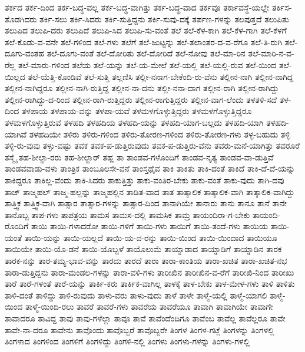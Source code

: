 {ತರ್ಕದ
ತರ್ಕ-ದಿಂದ
ತರ್ಕ-ಬದ್ಧ-ವಲ್ಲ
ತರ್ಕ-ಬದ್ಧ-ವಾಗಿತ್ತು
ತರ್ಕ-ಬದ್ಧ-ವಾದ
ತರ್ಕವೂ
ತರ್ಕಾವಸ್ಥೆ-ಯಲ್ಲೇ
ತರ್ಕಿಸ-ತೊಡಗಿದರು
ತರ್ಕಿ-ಸಲು
ತರ್ಕಿ-ಸಿದರು
ತರ್ಕಿ-ಸುತ್ತಿದ್ದನು
ತರ್ಕಿ-ಸುವು-ದಕ್ಕೆ
ತರ್ಪಣ-ಗಳನ್ನು
ತಲಪುತ್ತದೆ
ತಲುಪಿತು
ತಲುಪಿದ
ತಲುಪಿ-ದರು
ತಲುಪಿದೆ
ತಲುಪಿ-ಸಿದ
ತಲುಪಿ-ಸು-ವಂತೆ
ತಲೆ
ತಲೆ-ಕೆಳ-ಕಾಗಿ
ತಲೆ-ಕೆಳ-ಗಾಗಿ
ತಲೆ-ಕೆಳಗೆ
ತಲೆ-ಕೊಡು-ವ-ವನೇ
ತಲೆ-ಗಳಿಂದ
ತಲೆ-ಗಳು
ತಲೆಗೆ
ತಲೆ-ಜುಟ್ಟನ್ನು
ತಲೆ-ತಲಾಂತರ-ದ-ವ-ರೆಗೂ
ತಲೆ-ತಿ-ರುಗಿ
ತಲೆ-ದೂಗು-ವಂತಹ
ತಲೆ-ದೂಗು-ವಂತೆ
ತಲೆ-ದೋರಿತು
ತಲೆ-ದೋರಿದೆ
ತಲೆ-ನೋವು
ತಲೆ-ಮಾ-ರಿನ
ತಲೆ-ಮಾರಿ-ನ-ವ-ರೆಲ್ಲ
ತಲೆ-ಮಾರು-ಗಳಿಂದ
ತಲೆಯ
ತಲೆ-ಯನ್ನು
ತಲೆ-ಯ-ಮೇಲೆ
ತಲೆ-ಯಲ್ಲಿ
ತಲೆ-ಯಲ್ಲಿ-ರುವ
ತಲೆ-ಯಿಂದ
ತಲೆ-ಯಿಲ್ಲದ
ತಲೆ-ಯೆತ್ತಿ-ಕೊಂಡಿವೆ
ತಲೆ-ಸುತ್ತಿ
ತಲ್ಲಣಿಸಿ
ತಲ್ಲೀ-ನನಾಗ-ಬೇಕೆಂದಿ-ರು-ವೆನು
ತಲ್ಲೀನ-ನಾಗಿ
ತಲ್ಲೀನ-ನಾಗಿದ್ದ
ತಲ್ಲೀನ-ನಾಗಿದ್ದರೂ
ತಲ್ಲೀನ-ನಾಗಿ-ರುತ್ತಿದ್ದ
ತಲ್ಲೀನ-ನಾ-ದನು
ತಲ್ಲೀ-ನನಾ-ದಾಗ
ತಲ್ಲೀನ-ರಾಗಿ
ತಲ್ಲೀನ-ರಾಗಿದ್ದು
ತಲ್ಲೀನ-ರಾಗಿದ್ದು-ದ-ರಿಂದ
ತಲ್ಲೀನ-ರಾಗಿ-ರುತ್ತಿದ್ದರು
ತಲ್ಲೀನ-ರಾಗುತ್ತಿದ್ದರು
ತಲ್ಲೀನ-ವಾಗ-ಲೆಂದು
ತಳತಳಿ-ಸದೆ
ತಳ-ದಿಂದ
ತಳಪಾಯ
ತಳಪಾಯ-ವನ್ನು
ತಳಪಾ-ಯವೆ
ತಳಮಳಗೊಳ್ಳುತ್ತಿದ್ದರು
ತಳಮಳಗೊಳ್ಳುತ್ತಿದ್ದರೂ
ತಳಮಳಗೊಳ್ಳುತ್ತಿರುವೆ
ತಳಹದಿ
ತಳಹದಿಯ
ತಳಹದಿ-ಯನ್ನು
ತಳಹದಿ-ಯಾಗ-ಬಲ್ಲದು
ತಳಹದಿ-ಯಾಗಿ
ತಳಹದಿ-ಯಾಗಿವೆ
ತಳಹದಿಯೇ
ತಳಿರು
ತಳಿರು-ಗಳಿಂದ
ತಳಿರು-ತೋರಣ-ಗಳಿಂದ
ತಳಿರು-ತೋರಣ-ಗಳು
ತಳ್ಳ-ಬಹುದು
ತಳ್ಳಿ
ತಳ್ಳಿ-ರು-ವುವು
ತಳ್ಳು-ವಷ್ಟು
ತವಕ
ತವಕ-ಪ-ಡುತ್ತಿರುವುದು
ತವಕ-ಪ-ಡುತ್ತಿರು-ವೆನು
ತವರು-ಮನೆ-ಯಾಗಿತ್ತು
ತವರೂರೆ
ತಸ್ಮೈ
ತಹ-ಶೀಲ್ದಾ-ರರು
ತಹ-ಶೀಲ್ದಾರ್
ತಹ್ಲ
ತಾ
ತಾಂಡವ-ಗಳೊಂದಿಗೆ
ತಾಂಡವ-ನೃತ್ಯ
ತಾಂಡವ-ವಾ-ಡುತ್ತಿವೆ
ತಾಂಡವವಾಡು-ವಳು
ತಾಂತ್ರಿಕ
ತಾಂಬೂಲಸೇ-ವನೆ
ತಾಂಸ್ತಥೈವ
ತಾಕಿ
ತಾಕಿತು
ತಾಕಿ-ದಂತೆ
ತಾಕಿದೆ
ತಾಕಿ-ದೆ-ದೆ-ಯನ್ನು
ತಾಕಿದ್ದರೂ
ತಾಕಿಲ್ಲ-ವೆಂದು
ತಾಕಿ-ಸಿದರು
ತಾಕುತ್ತಿತ್ತು
ತಾಕು-ವಂತಿರ-ಬೇಕು
ತಾಕು-ವಂತೆ
ತಾಕು-ವುದು
ತಾಗಿ-ದವು
ತಾಜ್
ತಾಜ್ಮಹಲ್
ತಾಜ್ಮ-ಹಲ್ಲನ್ನು
ತಾಜ್ಮಹಲ್ಲಿನ
ತಾಡಿತ-ವಾದ
ತಾತ
ತಾತ್ಕಾಲಿಕ
ತಾತ್ಕಾಲಿಕ-ವಾಗಿ
ತಾತ್ಕಾಲಿಕ-ವಾಗಿದ್ದು
ತಾತ್ತ್ವಿಕ
ತಾತ್ತ್ವಿಕ-ವಾಗಿ
ತಾತ್ಸಾರ
ತಾತ್ಸಾರ-ಗಳನ್ನು
ತಾತ್ಸಾರ-ದಿಂದ
ತಾನಾಗಿಯೇ
ತಾನಾರು
ತಾನು
ತಾನೂ
ತಾನೆ
ತಾನೇ
ತಾನೊಬ್ಬ
ತಾಪ-ಗಳು
ತಾಪತ್ರಯ
ತಾಮಸ
ತಾಮಸ-ದಲ್ಲಿ
ತಾಮಸಿಕ
ತಾಮ್ರ
ತಾಯಂದಿರಾ-ಗ-ಬೇಕು
ತಾಯಂದಿ-ರೊಂದಿಗೆ
ತಾಯಿ
ತಾಯಿ-ಗಳಾದರೋ
ತಾಯಿ-ಗಳಿಗೆ
ತಾಯಿ-ಗಳು
ತಾಯಿಗೆ
ತಾಯಿ-ತಂದೆ-ಗಳು
ತಾಯಿಯ
ತಾಯಿ-ಯಂತೆ
ತಾಯಿ-ಯನ್ನು
ತಾಯಿ-ಯಲ್ಲದೆ
ತಾಯಿ-ಯ-ವ-ರನ್ನು
ತಾಯಿ-ಯಿಂದ
ತಾಯಿ-ಯಿಂದಾದ
ತಾಯಿಯೂ
ತಾಯಿಯೇ
ತಾಯಿ-ಯೊ-ಡನೆ
ತಾಯಿ-ಯೊಬ್ಬಳೆ
ತಾಯೊಲುಮೆ
ತಾಯ್ನಾಡಾದ
ತಾಯ್ನಾಡಿಗೆ
ತಾಯ್ನಾಡಿನ
ತಾರಕ
ತಾರಕ-ನನ್ನು
ತಾರ-ತಮ್ಯ-ಭಾವ-ವನ್ನು
ತಾರದು
ತಾರದೆ
ತಾರಾ
ತಾರಾ-ಕಾಂತಿಯ
ತಾರಾ-ಖಚಿತ
ತಾರಾ-ಖಚಿತ-ನಭ
ತಾರಾ-ಡುತ್ತಿದ್ದನು
ತಾರಾ-ಮಂಡಲ-ಗಳನ್ನು
ತಾರಾ-ವಳಿ-ಗಳು
ತಾರೀಖಿನ
ತಾರೀಖಿನ-ವ-ರೆಗೆ
ತಾರೀಖಿ-ನಿಂದ
ತಾರೀಖು
ತಾರೆ
ತಾರೆ-ಗಳಂತೆ
ತಾರೆ-ಯನ್ನು
ತಾರ್ಕಿ-ಕರು
ತಾರ್ಕಿಕ-ವಾಗಿಲ್ಲ
ತಾಳಕ್ಕೆ
ತಾಳ-ಬೇಕು
ತಾಳ-ಮೇಳ-ಗಳು
ತಾಳಿ
ತಾಳಿತು
ತಾಳಿ-ದಂತೆ
ತಾಳಿದ್ದು
ತಾಳಿ-ರುವುದು
ತಾಳು-ವರು
ತಾಳು-ವುದು
ತಾಳೆ
ತಾಳೇ
ತಾಳ್ಮೆ-ಯಲ್ಲಿ
ತಾಳ್ಮೆ-ಯಾಗಲಿ
ತಾಳ್ಮೆ-ಯಿಂದ
ತಾಳ್ಮೆ-ಯಿಂದಿ-ರಲು
ತಾವರೆ
ತಾವರೆ-ಗಳು
ತಾವರೆಯ
ತಾವರೆಯೂ
ತಾವಾಗಿ
ತಾವಾಗಿಯೇ
ತಾವಾಗೇ
ತಾವಾದರೂ
ತಾವಿದ್ದ
ತಾವು
ತಾವು-ಗಳೆಲ್ಲಾ
ತಾವೂ
ತಾವೆ
ತಾವೆಂದೆಂದಿಗೂ
ತಾವೆಂಬ
ತಾವೆಲ್ಲ
ತಾವೆಲ್ಲರೂ
ತಾವೇ
ತಾವೇ-ನಾ-ದರೂ
ತಾವೇನು
ತಾವೊಂದು
ತಾವೊಬ್ಬರೆ
ತಾವೊಬ್ಬರೇ
ತಿಂಗಳ
ತಿಂಗಳ-ಗಟ್ಲೆ
ತಿಂಗಳನ್ನು
ತಿಂಗಳಲ್ಲಿ
ತಿಂಗಳಾದ
ತಿಂಗಳಿಂದ
ತಿಂಗಳಿಗೆ
ತಿಂಗಳಿದ್ದು
ತಿಂಗಳಿ-ನಲ್ಲಿ
ತಿಂಗಳು
ತಿಂಗಳು-ಗಳನ್ನು
ತಿಂಗಳು-ಗಳಲ್ಲಿ
}
